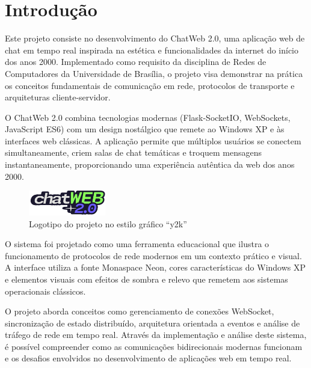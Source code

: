 \documentclass[conference,compsoc]{IEEEtran}
\begin{document}
\begin{otherlanguage}{brazil}
    




\section{Introdução}

Este projeto consiste no desenvolvimento do ChatWeb 2.0, uma aplicação web de chat em tempo real inspirada na estética e funcionalidades da internet do início dos anos 2000. Implementado como requisito da disciplina de Redes de Computadores da Universidade de Brasília, o projeto visa demonstrar na prática os conceitos fundamentais de comunicação em rede, protocolos de transporte e arquiteturas cliente-servidor.

O ChatWeb 2.0 combina tecnologias modernas (Flask-SocketIO, WebSockets, JavaScript ES6) com um design nostálgico que remete ao Windows XP e às interfaces web clássicas. A aplicação permite que múltiplos usuários se conectem simultaneamente, criem salas de chat temáticas e troquem mensagens instantaneamente, proporcionando uma experiência autêntica da web dos anos 2000.

\begin{figure}[!h]
\centering
\includegraphics[width=0.3\textwidth]{../media/chatweb.png}
\caption{Logotipo do projeto no estilo gráfico ``y2k''}
\label{fig:chatweb_logo}
\end{figure}

O sistema foi projetado como uma ferramenta educacional que ilustra o funcionamento de protocolos de rede modernos em um contexto prático e visual. A interface utiliza a fonte Monaspace Neon, cores características do Windows XP e elementos visuais com efeitos de sombra e relevo que remetem aos sistemas operacionais clássicos.

O projeto aborda conceitos como gerenciamento de conexões WebSocket, sincronização de estado distribuído, arquitetura orientada a eventos e análise de tráfego de rede em tempo real. Através da implementação e análise deste sistema, é possível compreender como as comunicações bidirecionais modernas funcionam e os desafios envolvidos no desenvolvimento de aplicações web em tempo real.


\end{otherlanguage}
\end{document}
